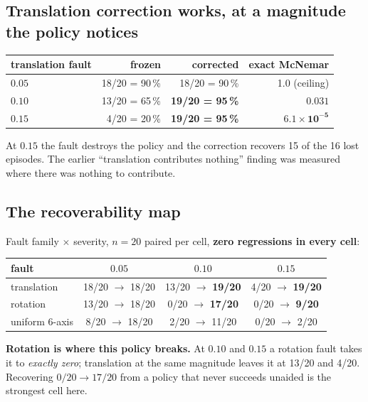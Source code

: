 \documentclass[11pt,a4paper]{article}
\begin{document}
\subsection{Translation correction works, at a magnitude the policy notices}

\begin{center}
\begin{tabular}{lrrr}
\toprule
translation fault & frozen & corrected & exact McNemar \\
\midrule
$0.05$ & 18/20 = 90\,\% & 18/20 = 90\,\% & 1.0 \quad(ceiling) \\
$0.10$ & 13/20 = 65\,\% & \textbf{19/20 = 95\,\%} & $\mathbf{0.031}$ \\
$0.15$ & \phantom{0}4/20 = 20\,\% & \textbf{19/20 = 95\,\%} & $\mathbf{6.1\times 10^{-5}}$ \\
\bottomrule
\end{tabular}
\end{center}

At $0.15$ the fault destroys the policy and the correction recovers 15 of the 16 lost
episodes. The earlier ``translation contributes nothing'' finding was measured where there
was nothing to contribute.

\subsection{The recoverability map}

Fault family $\times$ severity, $n = 20$ paired per cell, \textbf{zero regressions in every
cell}:

\begin{center}
\begin{tabular}{lccc}
\toprule
fault & $0.05$ & $0.10$ & $0.15$ \\
\midrule
translation    & 18/20 $\to$ 18/20 & 13/20 $\to$ \textbf{19/20} & 4/20 $\to$ \textbf{19/20} \\
rotation       & 13/20 $\to$ 18/20 & \phantom{0}0/20 $\to$ \textbf{17/20} & 0/20 $\to$ \textbf{9/20} \\
uniform 6-axis & \phantom{0}8/20 $\to$ 18/20 & \phantom{0}2/20 $\to$ 11/20 & 0/20 $\to$ \phantom{0}2/20 \\
\bottomrule
\end{tabular}
\end{center}

\textbf{Rotation is where this policy breaks.} At $0.10$ and $0.15$ a rotation fault takes it
to \emph{exactly zero}; translation at the same magnitude leaves it at 13/20 and 4/20.
Recovering $0/20 \to 17/20$ from a policy that never succeeds unaided is the strongest cell
here.
\end{document}
